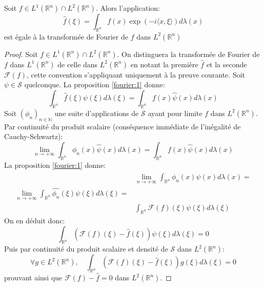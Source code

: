 \begin{mandatory}
\begin{prop}
Soit $f \in L^1(\mathbb{R}^n) \cap L^2(\mathbb{R}^n)$. Alors
l'application:
\[
\widehat{f}(\xi) = \int_{\mathbb{R}^n} f(x) \exp \left(- i \langle x ,
\xi \rangle \right) d\lambda(x)
\]
est égale à la transformée de Fourier de $f$ dans $L^2(\mathbb{R}^n)$
\end{prop}
\end{mandatory}
\begin{proof}
Soit $f \in L^1(\mathbb{R}^n) \cap L^2(\mathbb{R}^n)$. On distinguera la
transformée de Fourier de $f$ dans $L^1(\mathbb{R}^n)$ de celle dans
$L^2(\mathbb{R}^n)$ en notant la première $\widehat{f}$ et la seconde
$\mathcal{F}(f)$, cette convention s'appliquant uniquement à la preuve courante.
Soit $\psi \in \mathcal{S}$ quelconque. La proposition \ref{fourier:1} donne:
\[
\int_{\mathbb{R}^n} \widehat{f}(\xi) \psi(\xi) d \lambda(\xi) =
\int_{\mathbb{R}^n} f(x) \widehat{\psi}(x) d \lambda(x)
\]
Soit $(\phi_n)_{n \in \mathbb{N}}$ une suite d'applications de $\mathcal{S}$
ayant pour limite $f$ dans $ L^2(\mathbb{R}^n)$. Par continuité du produit
scalaire (conséquence immédiate de l'inégalité de Cauchy-Schwartz):
\[
\lim_{n \to +\infty} \int_{\mathbb{R}^n} \phi_n(x) \widehat{\psi}(x) d
\lambda(x) = \int_{\mathbb{R}^n} f(x) \widehat{\psi}(x) d \lambda(x)
\]
La proposition \ref{fourier:1} donne:
\begin{align*}
& \lim_{n \to +\infty} \int_{\mathbb{R}^n} \phi_n(x) \widehat{\psi}(x) d
\lambda(x) = \\
  \lim_{n \to +\infty} \int_{\mathbb{R}^n} \widehat{\phi_n}(\xi)
  \psi(\xi) d \lambda(\xi) = \\
  & \int_{\mathbb{R}^n} \mathcal{F}(f)(\xi)
  \psi(\xi) d \lambda(\xi)
\end{align*}
On en déduit donc:
\[
\int_{\mathbb{R}^n} \left(\mathcal{F}(f)(\xi)-\widehat{f}(\xi)\right)
  \psi(\xi) d \lambda(\xi) = 0
\]
Puis par continuité du produit scalaire et densité de $\mathcal{S}$ dans 
$L^2(\mathbb{R}^n)$:
\[
\forall g \in  L^2(\mathbb{R}^n), \quad \int_{\mathbb{R}^n} \left(\mathcal{F}(f)(\xi)-\widehat{f}(\xi)\right)
  g(\xi) d \lambda(\xi) = 0
\]
prouvant ainsi que $\mathcal{F}(f)-\widehat{f}=0$ dans $L^2(\mathbb{R}^n)$.
\end{proof}

